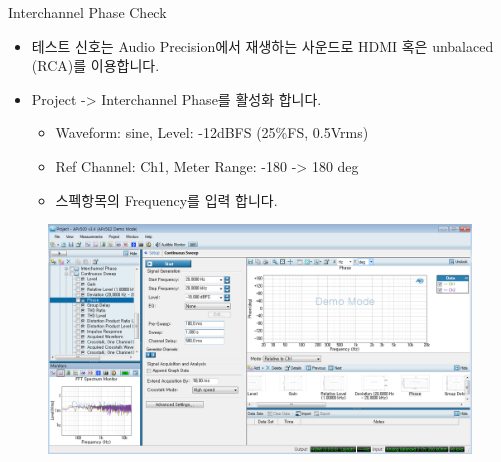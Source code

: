 \documentclass{beamer}
\begin{document}
\begin{frame}[t]{Interchannel Phase Check}
\begin{itemize}
\item 테스트 신호는 Audio Precision에서 재생하는 사운드로 HDMI 혹은 unbalaced (RCA)를 이용합니다.
\item Project -> Interchannel Phase를 활성화 합니다.
	\begin{itemize}
	\item Waveform: sine, Level: -12dBFS (25\%FS, 0.5Vrms)
	\item Ref Channel: Ch1, Meter Range: -180 -> 180 deg
	\item 스펙항목의 Frequency를 입력 합니다.
	\end{itemize}
\end{itemize}


\begin{figure}[b]
\includegraphics[height=0.4\textwidth]{figure/apsetting/interchannelPhase.png}
\end{figure}

\end{frame}
\end{document}
